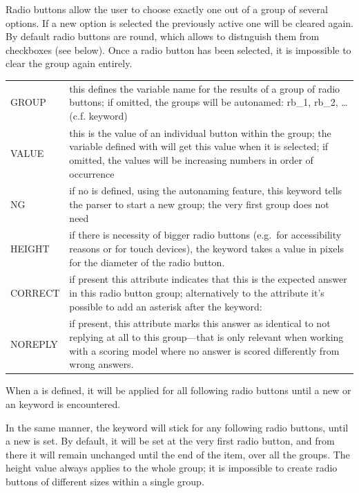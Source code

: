 \documentclass[12pt]{article} %
\newenvironment{keyword}{\leavevmode\color{magenta}}{}
\newenvironment{properties}
	{
    	\footnotesize\renewcommand{\arraystretch}{1.30}
  		\renewcommand{\tabcolsep}{0pt}
   		\begin{longtable}{>{\begin{keyword}}p{3.1cm}<{\end{keyword}}p{13.9cm}}
    	\hline
	}
	{
		\hline\end{longtable}\vspace{5mm}
	}
\begin{document}
Radio buttons allow the user to choose exactly one out of a group of several options.
If a new option is selected the previously active one will be cleared again.
By default radio buttons are round, which allows to distnguish them from checkboxes (see below).
Once a radio button has been selected, it is impossible to clear the group again entirely.

\begin{properties}
\hline
GROUP & this defines the variable name for the results of a group of radio buttons;
if omitted, the groups will be autonamed: rb\_1, rb\_2, \ldots (c.f. \kw{NG} keyword) \\
VALUE & this is the value of an individual button within the group;
the variable defined with \kw{GROUP} will get this value when it is selected;
if omitted, the values will be increasing numbers in order of occurrence \\
NG & if no \kw{GROUP} is defined, using the autonaming feature, this keyword tells the parser to start a new group;
the very first group does not need \kw{NG}\\
HEIGHT & if there is necessity of bigger radio buttons (e.g.\ for accessibility reasons or for touch devices), the \kw{HEIGHT} keyword takes a value in pixels for the diameter of the radio button. \\
CORRECT & if present this attribute indicates that this is the expected answer in this radio button group;
alternatively to the \kw{CORRECT} attribute it's possible to add an asterisk after the keyword: \kw{[@RB* ... @]} \\
NOREPLY & if present, this attribute marks this answer as identical to not replying at all to this group—that is only relevant when working with a scoring model where no answer is scored differently from wrong answers. \\
\hline
\end{properties}
\vspace{0.1cm}

When a  is defined, it will be applied for all following radio buttons until a new  or an  keyword is encountered.

In the same manner, the  keyword will stick for any following radio buttons, until a new  is set.
By default, it will be set at the very first radio button, and from there it will remain unchanged until the end of the item, over all the groups.
The height value always applies to the whole group;
it is impossible to create radio buttons of different sizes within a single group.\\
\end{document}
